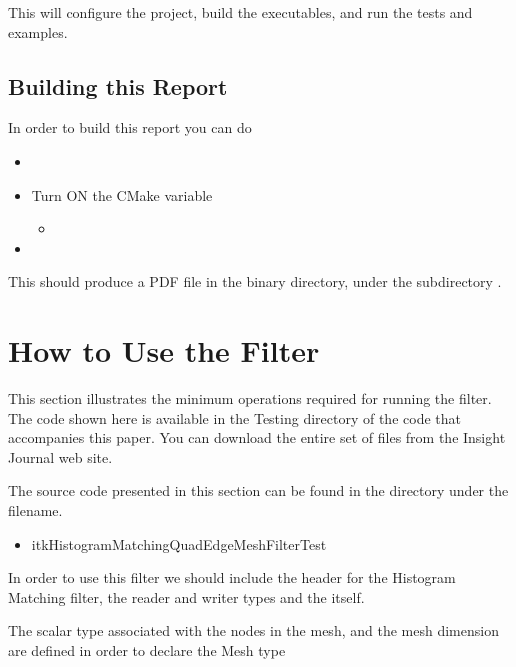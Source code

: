 \documentclass{InsightArticle}
\begin{document}
This will configure the project, build the executables, and run the tests and
examples. 


\subsection{Building this Report}

In order to build this report you can do

\begin{itemize}
\item {}
\item Turn ON the CMake variable
\begin{itemize}
\item {}
\end{itemize}
\item {}
\end{itemize}

This should produce a PDF file in the binary directory, under the subdirectory
.

\section{How to Use the Filter}

This section illustrates the minimum operations required for running the filter. The code shown here 
is available in the Testing directory of the code that accompanies this paper. You can download the 
entire set of files from the Insight Journal web site.

The source code presented in this section can be found in the  directory under the filename.

\begin{itemize}
\item itkHistogramMatchingQuadEdgeMeshFilterTest
\end{itemize}

In order to use this filter we should include the header for the Histogram Matching filter, 
the reader and writer types and the  itself.

\begin{center}

\end{center}

The scalar type associated with the nodes in the mesh, and the mesh dimension
are defined in order to declare the Mesh type
\end{document}
